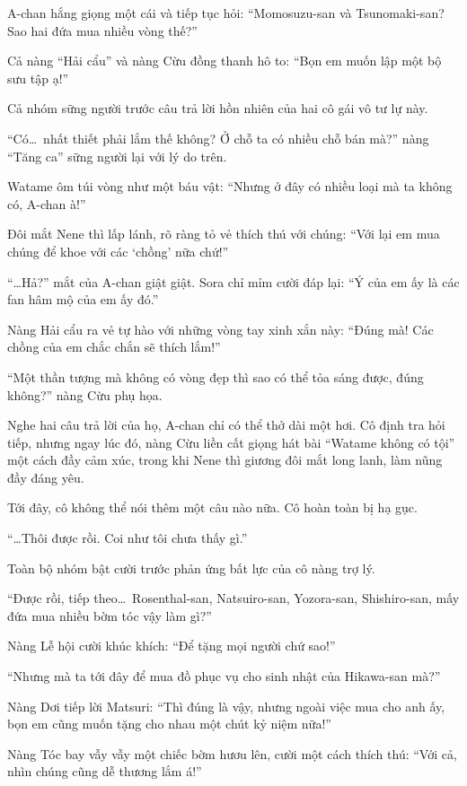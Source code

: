 \documentclass[../main.tex]{subfiles}
\begin{document}
A-chan hắng giọng một cái và tiếp tục hỏi: ``Momosuzu-san và Tsunomaki-san? Sao hai đứa mua nhiều vòng thế?''

Cả nàng ``Hải cẩu'' và nàng Cừu đồng thanh hô to: ``Bọn em muốn lập một bộ sưu tập ạ!''

Cả nhóm sững người trước câu trả lời hồn nhiên của hai cô gái vô tư lự này.

``Có\dots\ nhất thiết phải lắm thế không? Ở chỗ ta có nhiều chỗ bán mà?'' nàng ``Tăng ca'' sững người lại với lý do trên.

Watame ôm túi vòng như một báu vật: ``Nhưng ở đây có nhiều loại mà ta không có, A-chan à!''

Đôi mắt Nene thì lấp lánh, rõ ràng tỏ vẻ thích thú với chúng: ``Với lại em mua chúng để khoe với các `chồng' nữa chứ!''

``\dots Hả?'' mắt của A-chan giật giật. Sora chỉ mỉm cười đáp lại: ``Ý của em ấy là các fan hâm mộ của em ấy đó.''

Nàng Hải cẩu ra vẻ tự hào với những vòng tay xinh xắn này: ``Đúng mà! Các chồng của em chắc chắn sẽ thích lắm!''

``Một thần tượng mà không có vòng đẹp thì sao có thể tỏa sáng được, đúng không?'' nàng Cừu phụ họa.

Nghe hai câu trả lời của họ, A-chan chỉ có thể thở dài một hơi.  Cô định tra hỏi tiếp, nhưng ngay lúc đó, nàng Cừu liền cất giọng hát bài ``Watame không có tội'' một cách đầy cảm xúc, trong khi Nene thì giương đôi mắt long lanh, làm nũng đầy đáng yêu.

Tới đây, cô không thể nói thêm một câu nào nữa. Cô hoàn toàn bị hạ gục.

``\dots Thôi được rồi. Coi như tôi chưa thấy gì.''

Toàn bộ nhóm bật cười trước phản ứng bất lực của cô nàng trợ lý.

``Được rồi, tiếp theo\dots\ Rosenthal-san, Natsuiro-san, Yozora-san, Shishiro-san, mấy đứa mua nhiều bờm tóc vậy làm gì?''

Nàng Lễ hội cười khúc khích: ``Để tặng mọi người chứ sao!''

``Nhưng mà ta tới đây để mua đồ phục vụ cho sinh nhật của Hikawa-san mà?''

Nàng Dơi tiếp lời Matsuri: ``Thì đúng là vậy, nhưng ngoài việc mua cho anh ấy, bọn em cũng muốn tặng cho nhau một chút kỷ niệm nữa!''

Nàng Tóc bay vẫy vẫy một chiếc bờm hươu lên, cười một cách thích thú: ``Với cả, nhìn chúng cũng dễ thương lắm á!''
\end{document}
